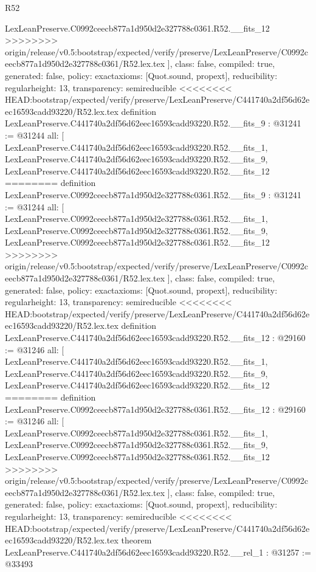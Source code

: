 \begin{lexlean}{R52}
\begin{coremodule}
{{{{{{{{{{{{{{{{{{{{{{{{{{{{{{{{{{{{{{{{{{{{{{{{{{{{{{{{{{{{{{{{{{{{{{{{{{{{{{{{{{{{{{{{{{{{{{{{{{{{{{{{{{{{{{{{{{{{{{{{{{{{{{{{{{{{{{{{{{{{{{{{{{{{{{    LexLeanPreserve.C0992ceecb877a1d950d2e327788c0361.R52.__fits_12
>>>>>>>> origin/release/v0.5:bootstrap/expected/verify/preserve/LexLeanPreserve/C0992ceecb877a1d950d2e327788c0361/R52.lex.tex
  ],
  class: false,
  compiled: true,
  generated: false,
  policy: exact{axioms: [Quot.sound, propext]},
  reducibility: regular{height: 13},
  transparency: semireducible
}
<<<<<<<< HEAD:bootstrap/expected/verify/preserve/LexLeanPreserve/C441740a2df56d62eec16593cadd93220/R52.lex.tex
definition LexLeanPreserve.C441740a2df56d62eec16593cadd93220.R52.__fits_9 : @31241 := @31244 {
  all: [
    LexLeanPreserve.C441740a2df56d62eec16593cadd93220.R52.__fits_1,
    LexLeanPreserve.C441740a2df56d62eec16593cadd93220.R52.__fits_9,
    LexLeanPreserve.C441740a2df56d62eec16593cadd93220.R52.__fits_12
========
definition LexLeanPreserve.C0992ceecb877a1d950d2e327788c0361.R52.__fits_9 : @31241 := @31244 {
  all: [
    LexLeanPreserve.C0992ceecb877a1d950d2e327788c0361.R52.__fits_1,
    LexLeanPreserve.C0992ceecb877a1d950d2e327788c0361.R52.__fits_9,
    LexLeanPreserve.C0992ceecb877a1d950d2e327788c0361.R52.__fits_12
>>>>>>>> origin/release/v0.5:bootstrap/expected/verify/preserve/LexLeanPreserve/C0992ceecb877a1d950d2e327788c0361/R52.lex.tex
  ],
  class: false,
  compiled: true,
  generated: false,
  policy: exact{axioms: [Quot.sound, propext]},
  reducibility: regular{height: 13},
  transparency: semireducible
}
<<<<<<<< HEAD:bootstrap/expected/verify/preserve/LexLeanPreserve/C441740a2df56d62eec16593cadd93220/R52.lex.tex
definition LexLeanPreserve.C441740a2df56d62eec16593cadd93220.R52.__fits_12 : @29160 := @31246 {
  all: [
    LexLeanPreserve.C441740a2df56d62eec16593cadd93220.R52.__fits_1,
    LexLeanPreserve.C441740a2df56d62eec16593cadd93220.R52.__fits_9,
    LexLeanPreserve.C441740a2df56d62eec16593cadd93220.R52.__fits_12
========
definition LexLeanPreserve.C0992ceecb877a1d950d2e327788c0361.R52.__fits_12 : @29160 := @31246 {
  all: [
    LexLeanPreserve.C0992ceecb877a1d950d2e327788c0361.R52.__fits_1,
    LexLeanPreserve.C0992ceecb877a1d950d2e327788c0361.R52.__fits_9,
    LexLeanPreserve.C0992ceecb877a1d950d2e327788c0361.R52.__fits_12
>>>>>>>> origin/release/v0.5:bootstrap/expected/verify/preserve/LexLeanPreserve/C0992ceecb877a1d950d2e327788c0361/R52.lex.tex
  ],
  class: false,
  compiled: true,
  generated: false,
  policy: exact{axioms: [Quot.sound, propext]},
  reducibility: regular{height: 13},
  transparency: semireducible
}
<<<<<<<< HEAD:bootstrap/expected/verify/preserve/LexLeanPreserve/C441740a2df56d62eec16593cadd93220/R52.lex.tex
theorem LexLeanPreserve.C441740a2df56d62eec16593cadd93220.R52.__rel_1 : @31257 := @33493 {
}}}}}}}}}}}}}}}}}}}}}}}}}}}}}}}}}}}}}}}}}}}}}}}}}}}}}}}}}}}}}}}}}}}}}}}}}}}}}}}}}}}}}}}}}}}}}}}}}}}}}}}}}}}}}}}}}}}}}}}}}}}}}}}}}}}}}}}}}}}}}}}}}}}}}}}}
\end{coremodule}
\end{lexlean}
